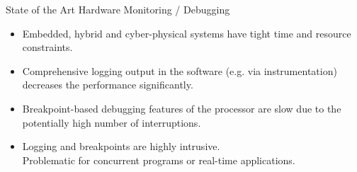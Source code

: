 
\begin{frame}{State of the Art Hardware Monitoring / Debugging}
  \begin{itemize}
    \item Embedded, hybrid and cyber-physical systems have
      \alert{tight time and resource constraints}.
    \item Comprehensive \alert{logging} output in the software (e.g. via instrumentation)  \alert{decreases the performance} significantly.
    \item \alert{Breakpoint}-based debugging features of the processor \alert{are slow}
      due to the potentially high number of interruptions.
    \item Logging and breakpoints are \alert{highly intrusive}.\\
      Problematic for \alert{concurrent programs} or \alert{real-time} applications.
  \end{itemize}
\end{frame}

